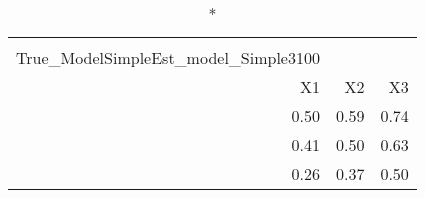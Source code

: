 \begin{longtable}{rrr}
\caption*{
{\large Pestmatrix} \\ 
{\small True\_ModelSimpleEst\_model\_Simple3100}
} \\ 
\toprule
X1 & X2 & X3 \\ 
\midrule
0.50 & 0.59 & 0.74 \\ 
0.41 & 0.50 & 0.63 \\ 
0.26 & 0.37 & 0.50 \\ 
\bottomrule
\end{longtable}

